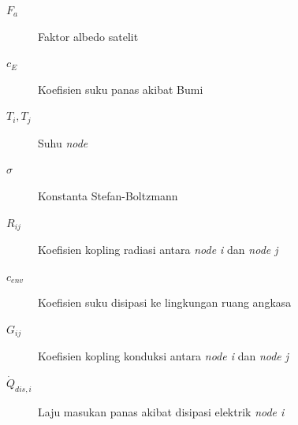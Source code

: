 \documentclass[8pt]{beamer}
\begin{document}
\begin{frame}
\begin{columns}[T]
\begin{description}
        \item[$F_{a}$] Faktor albedo satelit 
        \item[$c_{E}$] Koefisien suku panas akibat Bumi
        \item[$T_{i}, T_{j}$] Suhu \textit{node}
        \item[$\sigma$] Konstanta Stefan-Boltzmann 
        \item[$R_{ij}$] Koefisien kopling radiasi antara \textit{node i} dan \textit{node j}
        \item[$c_{env}$] Koefisien suku disipasi ke lingkungan ruang angkasa
        \item[$G_{ij}$] Koefisien kopling konduksi antara \textit{node i} dan \textit{node j}
        \item[$\dot{Q}_{dis,i}$] Laju masukan panas akibat disipasi elektrik \textit{node i}

\end{description}
  \end{columns}
\end{frame}
\end{document}
